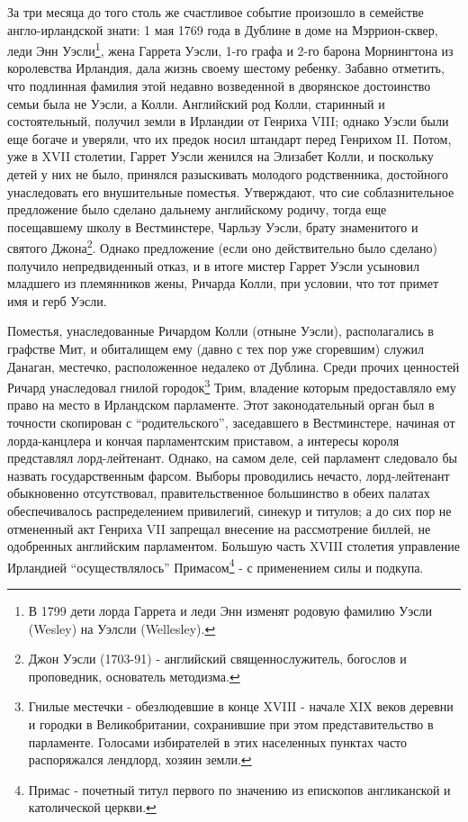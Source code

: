 \documentclass[
  oneside,
  12pt,
  titlepage]{book}
\begin{document}
За три месяца до того столь же счастливое событие произошло в семействе англо-ирландской знати: 1 мая 1769 года в Дублине в доме на Мэррион-сквер, леди Энн Уэсли\footnote{В 1799 дети лорда Гаррета и леди Энн изменят родовую фамилию Уэсли (Wesley) на Уэлсли (Wellesley).}, жена Гаррета Уэсли, 1-го графа и 2-го барона Морнингтона из королевства Ирландия, дала жизнь своему шестому ребенку. Забавно отметить, что подлинная фамилия этой недавно возведенной в дворянское достоинство семьи была не Уэсли, а Колли. Английский род Колли, старинный и состоятельный, получил земли в Ирландии от Генриха VIII; однако Уэсли были еще богаче и уверяли, что их предок носил штандарт перед Генрихом II. Потом, уже в XVII столетии, Гаррет Уэсли женился на Элизабет Колли, и поскольку детей у них не было, принялся разыскивать молодого родственника, достойного унаследовать его внушительные поместья. Утверждают, что сие соблазнительное предложение было сделано дальнему английскому родичу, тогда еще посещавшему школу в Вестминстере, Чарльзу Уэсли, брату знаменитого и святого Джона\footnote{Джон Уэсли (1703-91) - английский священнослужитель, богослов и проповедник, основатель методизма.}. Однако предложение (если оно действительно было сделано) получило непредвиденный отказ, и в итоге мистер Гаррет Уэсли усыновил младшего из племянников жены, Ричарда Колли, при условии, что тот примет имя и герб Уэсли.

Поместья, унаследованные Ричардом Колли (отныне Уэсли), располагались в графстве Мит, и обиталищем ему (давно с тех пор уже сгоревшим) служил Данаган, местечко, расположенное недалеко от Дублина. Среди прочих ценностей Ричард унаследовал гнилой городок\footnote{Гнилые местечки - обезлюдевшие в конце XVIII - начале XIX веков деревни и городки в Великобритании, сохранившие при этом представительство в парламенте. Голосами избирателей в этих населенных пунктах часто распоряжался лендлорд, хозяин земли.} Трим, владение которым предоставляло ему право на место в Ирландском парламенте. Этот законодательный орган был в точности скопирован с ``родительского'', заседавшего в Вестминстере, начиная от лорда-канцлера и кончая парламентским приставом, а интересы короля представлял лорд-лейтенант. Однако, на самом деле, сей парламент следовало бы назвать государственным фарсом. Выборы проводились нечасто, лорд-лейтенант обыкновенно отсутствовал, правительственное большинство в обеих палатах обеспечивалось распределением привилегий, синекур и титулов; а до сих пор не отмененный акт Генриха VII запрещал внесение на рассмотрение биллей, не одобренных английским парламентом. Большую часть XVIII столетия управление Ирландией ``осуществлялось'' Примасом\footnote{Примас - почетный титул первого по значению из епископов англиканской и католической церкви.} - с применением силы и подкупа.
\end{document}
